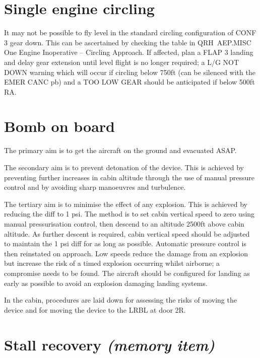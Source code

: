 \documentclass[a5paper,11pt,twoside]{book}
\newcommand{\multicite}[1]{
  \nopagebreak
  \noindent{\footnotesize\color{blue}{[ #1 ]}}
}
\begin{document}
\multicite{FCTM~PRO.AEP.ENG.EFDC}
\section{Single engine circling}

It may not be possible to fly level in the standard circling configuration of
CONF 3 gear down. This can be ascertained by checking the table in QRH~AEP.MISC
One Engine Inoperative – Circling Approach. If affected, plan a FLAP 3 landing
and delay gear extension until level flight is no longer required; a L/G NOT
DOWN warning which will occur if circling below 750ft (can be silenced with the
EMER CANC pb) and a TOO LOW GEAR should be anticipated if below 500ft RA.

\multicite{QRH~AEP.MISC}

\section{Bomb on board}

The primary aim is to get the aircraft on the ground and evacuated ASAP.

The secondary aim is to prevent detonation of the device. This is achieved by
preventing further increases in cabin altitude through the use of manual
pressure control and by avoiding sharp manoeuvres and turbulence.

The tertiary aim is to minimise the effect of any explosion. This is achieved by
reducing the diff to 1 psi. The method is to set cabin vertical speed to zero
using manual pressurisation control, then descend to an altitude 2500ft above
cabin altitude. As further descent is required, cabin vertical speed should be
adjusted to maintain the 1 psi diff for as long as possible. Automatic pressure
control is then reinstated on approach. Low speeds reduce the damage from an
explosion but increase the risk of a timed explosion occurring whilst airborne;
a compromise needs to be found. The aircraft should be configured for landing as
early as possible to avoid an explosion damaging landing systems.

In the cabin, procedures are laid down for assessing the risks of moving the
device and for moving the device to the LRBL at door 2R.

\multicite{QRH~AER.80, FCOM~PRO.AER.MISC}

\section{Stall recovery \emph{(memory item)}}
\end{document}
